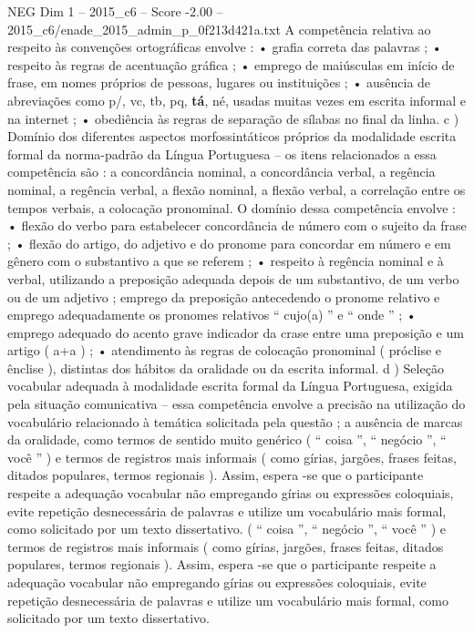 \begin{textsample}{NEG Dim 1 – 2015\_c6 – Score -2.00 – 2015\_c6/enade\_2015\_admin\_p\_0f213d421a.txt}
A competência relativa ao respeito às convenções ortográficas envolve : • grafia correta das palavras ; • respeito às regras de acentuação gráfica ; • emprego de maiúsculas em início de frase, em nomes próprios de pessoas, lugares ou instituições ; • ausência de abreviações como p/, vc, tb, pq, \textbf{tá}, né, usadas muitas vezes em escrita informal e na internet ; • obediência às regras de separação de sílabas no final da linha. c ) Domínio dos diferentes aspectos morfossintáticos próprios da modalidade escrita formal da norma-padrão da Língua Portuguesa – os itens relacionados a essa competência são : a concordância nominal, a concordância verbal, a regência nominal, a regência verbal, a flexão nominal, a flexão verbal, a correlação entre os tempos verbais, a colocação pronominal.
O domínio dessa competência envolve : • flexão do verbo para estabelecer concordância de número com o sujeito da frase ; • flexão do artigo, do adjetivo e do pronome para concordar em número e em gênero com o substantivo a que se referem ; • respeito à regência nominal e à verbal, utilizando a preposição adequada depois de um substantivo, de um verbo ou de um adjetivo ; emprego da preposição antecedendo o pronome relativo e emprego adequadamente os pronomes relativos “ cujo(a) ” e “ onde ” ; • emprego adequado do acento grave indicador da crase entre uma preposição e um artigo ( a+a ) ; • atendimento às regras de colocação pronominal ( próclise e ênclise ), distintas dos hábitos da oralidade ou da escrita informal. d ) Seleção vocabular adequada à modalidade escrita formal da Língua Portuguesa, exigida pela situação comunicativa – essa competência envolve a precisão na utilização do vocabulário relacionado à temática solicitada pela questão ; a ausência de marcas da oralidade, como termos de sentido muito genérico ( “ coisa ”, “ negócio ”, “ você ” ) e termos de registros mais informais ( como gírias, jargões, frases feitas, ditados populares, termos regionais ).
Assim, espera -se que o participante respeite a adequação vocabular não empregando gírias ou expressões coloquiais, evite repetição desnecessária de palavras e utilize um vocabulário mais formal, como solicitado por um texto dissertativo. ( “ coisa ”, “ negócio ”, “ você ” ) e termos de registros mais informais ( como gírias, jargões, frases feitas, ditados populares, termos regionais ).
Assim, espera -se que o participante respeite a adequação vocabular não empregando gírias ou expressões coloquiais, evite repetição desnecessária de palavras e utilize um vocabulário mais formal, como solicitado por um texto dissertativo.

\end{textsample}
